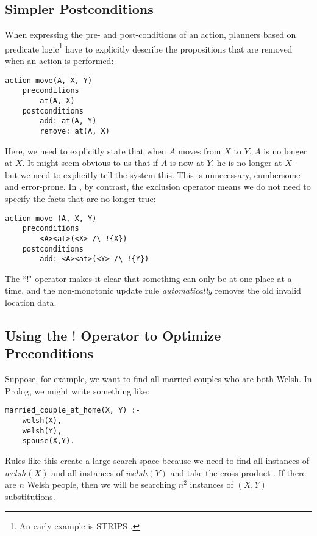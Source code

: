 \subsection{Simpler Postconditions}

When expressing the pre- and post-conditions of an action, planners
based on predicate logic\footnote{An early example is STRIPS
  \cite{strips}.} have to explicitly describe the propositions that
are removed when an action is performed:
\begin{verbatim}
action move(A, X, Y)
    preconditions
        at(A, X)
    postconditions
        add: at(A, Y) 
        remove: at(A, X)
\end{verbatim}
Here, we need to explicitly state that when $A$ moves from $X$ to $Y$, $A$ is no longer at $X$. It might seem obvious to us that if $A$ is now at $Y$, he is no longer at $X$ - but we need to explicitly tell the system this. This is unnecessary, cumbersome and error-prone. In \ELFULL{}, by contrast, the exclusion operator means we do not need to specify the facts that are no longer true:
\begin{verbatim}
action move (A, X, Y)
    preconditions
        <A><at>(<X> /\ !{X})
    postconditions
        add: <A><at>(<Y> /\ !{Y})
\end{verbatim}
The ``!" operator makes it clear that something can only be at one
place at a time, and the non-monotonic update rule
\emph{automatically} removes the old invalid location data.

\subsection{Using the $!$ Operator to Optimize Preconditions}
\label{optimizingpreconditions}
Suppose, for example, we want to find all married couples who are both Welsh.
In Prolog, we might write something like:
\begin{verbatim}
married_couple_at_home(X, Y) :-
    welsh(X),
    welsh(Y),
    spouse(X,Y).
\end{verbatim}	
Rules like this create a large search-space because we need to find all instances of $welsh(X)$ and all instances of  $welsh(Y)$ and take the cross-product \cite{smith-and-genesereth}. If there are $n$ Welsh people, then we will be searching $n^2$ instances of $(X,Y)$ substitutions.

